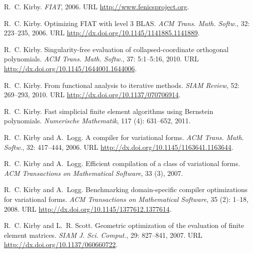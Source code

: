 \begin{thebibliography}{467}
R.~C. Kirby.
\newblock \emph{{FIAT}}, 2006{}.
\newblock URL \url{http://www.fenicsproject.org}.

R.~C. Kirby.
\newblock Optimizing {FIAT} with level 3 {BLAS}.
\newblock \emph{ACM Trans. Math. Softw.}, 32: 223--235,
  2006{}.
\newblock URL \url{http://dx.doi.org/10.1145/1141885.1141889}.

R.~C. Kirby.
\newblock Singularity-free evaluation of collapsed-coordinate orthogonal
  polynomials.
\newblock \emph{ACM Trans. Math. Softw.}, 37: 5:1--5:16,
  2010{}.
\newblock URL \url{http://dx.doi.org/10.1145/1644001.1644006}.

R.~C. Kirby.
\newblock From functional analysis to iterative methods.
\newblock \emph{SIAM Review}, 52: 269--293, 2010{}.
\newblock URL \url{http://dx.doi.org/10.1137/070706914}.

R.~C. Kirby.
\newblock Fast simplicial finite element algorithms using {B}ernstein
  polynomials.
\newblock \emph{Numerische Mathematik}, 117 (4): 631--652,
  2011.

R.~C. Kirby and A.~Logg.
\newblock A compiler for variational forms.
\newblock \emph{ACM Trans. Math. Softw.}, 32: 417--444, 2006.
\newblock URL \url{http://dx.doi.org/10.1145/1163641.1163644}.

R.~C. Kirby and A.~Logg.
\newblock Efficient compilation of a class of variational forms.
\newblock \emph{ACM Transactions on Mathematical Software}, 33 (3),
  2007.

R.~C. Kirby and A.~Logg.
\newblock Benchmarking domain-specific compiler optimizations for variational
  forms.
\newblock \emph{ACM Transactions on Mathematical Software}, 35
  (2): 1--18, 2008.
\newblock URL \url{http://dx.doi.org/10.1145/1377612.1377614}.

R.~C. Kirby and L.~R. Scott.
\newblock Geometric optimization of the evaluation of finite element matrices.
\newblock \emph{SIAM J. Sci. Comput.}, 29: 827--841, 2007.
\newblock URL \url{http://dx.doi.org/10.1137/060660722}.


\end{thebibliography}
